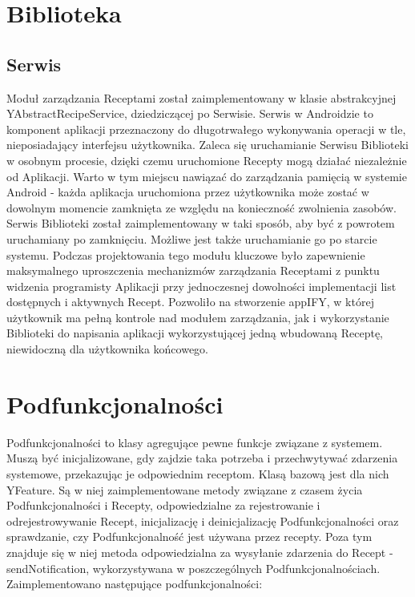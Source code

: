 \documentclass[11pt,a4paper,polish,thesis]{dcsbook}
\begin{document}
\section{Biblioteka}
\subsection{Serwis}
Moduł zarządzania Receptami został zaimplementowany w klasie abstrakcyjnej YAbstractRecipeService, dziedziczącej po Serwisie.
Serwis w Androidzie to komponent aplikacji przeznaczony do długotrwałego wykonywania operacji w tle, nieposiadający interfejsu użytkownika. \cite{android.serwis}
Zaleca się uruchamianie Serwisu Biblioteki w osobnym procesie, dzięki czemu uruchomione Recepty mogą działać niezależnie od Aplikacji. Warto w tym miejscu nawiązać do zarządzania pamięcią w systemie Android - każda aplikacja uruchomiona przez użytkownika może zostać w dowolnym momencie zamknięta ze względu na konieczność zwolnienia zasobów. Serwis Biblioteki został zaimplementowany w taki sposób, aby być z powrotem uruchamiany po zamknięciu. Możliwe jest także uruchamianie go po starcie systemu.
Podczas projektowania tego modułu kluczowe było zapewnienie maksymalnego uproszczenia mechanizmów zarządzania Receptami z punktu widzenia programisty Aplikacji przy jednoczesnej dowolności implementacji list dostępnych i aktywnych Recept. Pozwoliło na stworzenie appIFY, w której użytkownik ma pełną kontrole nad modułem zarządzania, jak i wykorzystanie Biblioteki do napisania aplikacji wykorzystującej jedną wbudowaną Receptę, niewidoczną dla użytkownika końcowego.

\section{Podfunkcjonalności}
Podfunkcjonalności to klasy agregujące pewne funkcje związane z systemem. Muszą być inicjalizowane, gdy zajdzie taka potrzeba i przechwytywać zdarzenia systemowe, przekazując je odpowiednim receptom. Klasą bazową jest dla nich YFeature. Są w niej zaimplementowane metody związane z czasem życia Podfunkcjonalności i Recepty, odpowiedzialne za rejestrowanie i odrejestrowywanie Recept, inicjalizację i deinicjalizację Podfunkcjonalności oraz sprawdzanie, czy Podfunkcjonalność jest używana przez recepty. Poza tym znajduje się w niej metoda odpowiedzialna za wysyłanie zdarzenia do Recept - sendNotification, wykorzystywana w poszczególnych Podfunkcjonalnościach. Zaimplementowano następujące podfunkcjonalności:
\end{document}
